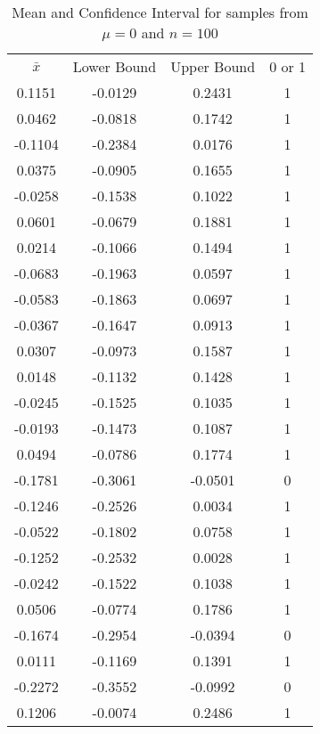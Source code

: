 \documentclass[12pt]{extarticle}
\begin{document}
\begin{table}[h!]
\caption{Mean and Confidence Interval for samples from $\mu = 0$ and $n=100$}
\centering
\begin{tabular}{cccc}
\\
$\bar{x}$ & Lower Bound & Upper Bound & 0 or 1 \\ [0.5ex]
0.1151 & -0.0129 & 0.2431 & 1 \\ 
0.0462 & -0.0818 & 0.1742 & 1 \\ 
-0.1104 & -0.2384 & 0.0176 & 1 \\ 
0.0375 & -0.0905 & 0.1655 & 1 \\ 
-0.0258 & -0.1538 & 0.1022 & 1 \\ 
0.0601 & -0.0679 & 0.1881 & 1 \\ 
0.0214 & -0.1066 & 0.1494 & 1 \\ 
-0.0683 & -0.1963 & 0.0597 & 1 \\ 
-0.0583 & -0.1863 & 0.0697 & 1 \\ 
-0.0367 & -0.1647 & 0.0913 & 1 \\ 
0.0307 & -0.0973 & 0.1587 & 1 \\ 
0.0148 & -0.1132 & 0.1428 & 1 \\ 
-0.0245 & -0.1525 & 0.1035 & 1 \\ 
-0.0193 & -0.1473 & 0.1087 & 1 \\ 
0.0494 & -0.0786 & 0.1774 & 1 \\ 
-0.1781 & -0.3061 & -0.0501 & 0 \\ 
-0.1246 & -0.2526 & 0.0034 & 1 \\ 
-0.0522 & -0.1802 & 0.0758 & 1 \\ 
-0.1252 & -0.2532 & 0.0028 & 1 \\ 
-0.0242 & -0.1522 & 0.1038 & 1 \\ 
0.0506 & -0.0774 & 0.1786 & 1 \\ 
-0.1674 & -0.2954 & -0.0394 & 0 \\ 
0.0111 & -0.1169 & 0.1391 & 1 \\ 
-0.2272 & -0.3552 & -0.0992 & 0 \\ 
0.1206 & -0.0074 & 0.2486 & 1 \\
\end{tabular}
\label{table:1}
\end{table}
\end{document}
